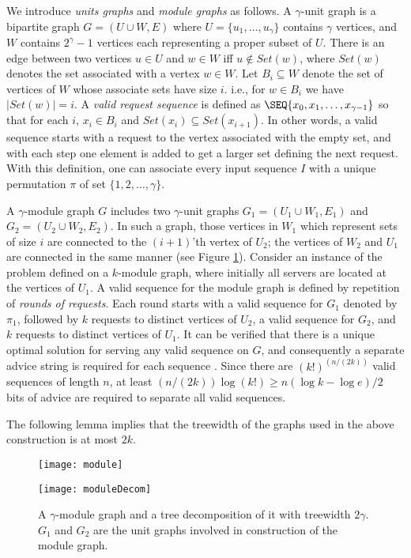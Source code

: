 We introduce \textit{units graphs} and \textit{module graphs} as follows. A $\gamma$-unit graph is a bipartite graph $G = (U \cup  W, E)$ where $U=\{u_1, \ldots, u_\gamma\}$ contains $\gamma$ vertices, and $W$ contains $2^\gamma-1$ vertices each representing a proper subset of $U$. There is an edge between two vertices $u \in U$ and $w \in W$ iff $u \notin Set(w)$, where $Set(w)$ denotes the set associated with a vertex $w \in W$. 
Let $B_{i} \subseteq W$ denote the set of vertices of $W$ whose associate sets have size $i$. i.e., for $w \in B_i $ we have $|Set(w)| = i$. A \textit{valid request sequence} is defined as $\SEQ{x_{0}, x_{1}, \ldots , x_{\gamma-1}}$ so that for each $i$, $x_{i} \in B_{i}$ and $Set(x_{i}) \subseteq Set(x_{i+1})$. In other words, a valid sequence starts with a request to the vertex associated with the empty set, and with each step one element is added to get a larger set defining the next request. With this definition, one can associate every input sequence $I$ with a unique permutation $\pi$ of set $\{1, 2, \ldots, \gamma\}$.

A $\gamma$-module graph $G$ includes two $\gamma$-unit graphs $G_1 = (U_1 \cup  W_1, E_1)$ and $G_2 =(U_2 \cup  W_2, E_2)$. In such a graph, those vertices in $W_1$ which represent sets of size $i$ are connected to the $(i+1)$'th vertex of $U_2$; the vertices of $W_2$ and $U_1$ are connected in the same manner (see Figure \ref{fig:module}). Consider an instance of the \ks problem defined on a $k$-module graph, where initially all servers are located at the vertices of $U_1$. A valid sequence for the module graph is defined by repetition of \textit{rounds of requests}. Each round starts with a valid sequence for $G_1$ denoted by $\pi_1$, followed by $k$ requests to distinct vertices of $U_2$, a valid sequence for $G_2$, and $k$ requests to distinct vertices of $U_1$. It can be verified that there is a unique optimal solution for serving any valid sequence on $G$, and consequently a separate advice string is required for each sequence \cite{Bock11}. Since there are $(k!)^{(n/(2k))}$ valid sequences of length $n$, 
at least $(n/(2k)) \log (k!) \geq n(\log k-\log e)/2$ bits of advice are required to separate all valid sequences. 

The following lemma implies that the treewidth of the graphs used in the above construction is at most $2k$. 

\begin{figure}[t] 
\begin{minipage}{0.6 \linewidth}
\centering
\texttt{[image: module]}
\label{fig:module1}
\end{minipage}
\hspace{.2cm}
\begin{minipage}{0.4\linewidth}
\centering
\texttt{[image: moduleDecom]}
\label{fig:module2}
\end{minipage}
\caption{A $\gamma$-module graph and a tree decomposition of it with treewidth $2 \gamma$. $G_1$ and $G_2$ are the unit graphs involved in construction of the module graph. \label{fig:module}}
\end{figure}


